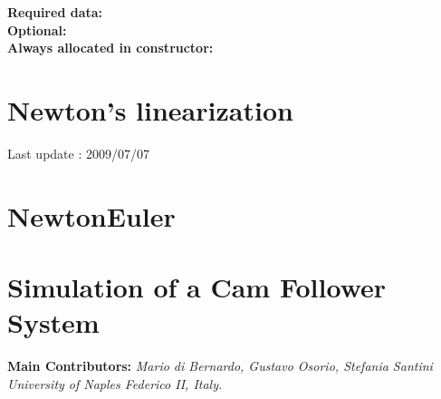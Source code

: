 \documentclass[10pt]{report}
\begin{document}
\bf{Required data:}\\

\bf{Optional:}\\

\bf{Always allocated in constructor:} \\


\chapter{Newton's linearization}
Last update : 2009/07/07




\chapter{NewtonEuler}


%  


\chapter{Simulation of a Cam Follower System}
{\bf Main Contributors:} {\textit{Mario di Bernardo, Gustavo Osorio, Stefania Santini}}\\
\textit{University of Naples Federico II, Italy.}\\


\end{document}
